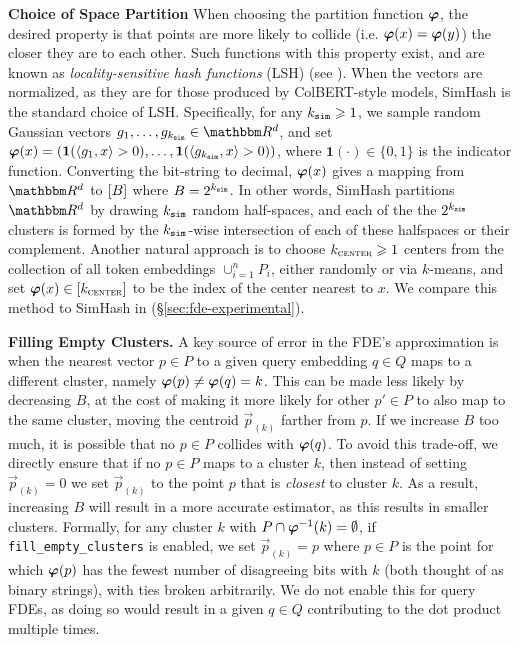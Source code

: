 \textbf{Choice of Space Partition} When choosing the partition function $\bvarphi$, the desired property is that points are more likely to collide (i.e. $\bvarphi(x)=\bvarphi(y)$) the closer they are to each other. Such functions with this property exist, and are known as \textit{locality-sensitive hash functions} (LSH) (see \cite{HIM12}). When the vectors are normalized, as they are for those produced by ColBERT-style models, SimHash \cite{charikar2002similarity} is the standard choice of LSH. Specifically, for any $\ksim \geq 1$, we sample random Gaussian vectors $g_1,\dots,g_{\ksim} \in \R^d$, and set $\bvarphi(x)= (\mathbf{1}(\langle g_1, x\rangle > 0), \dots,\mathbf{1}(\langle g_{\ksim} , x\rangle> 0) )$, where $\mathbf{1}(\cdot) \in \{0,1\}$ is the indicator function.  Converting the bit-string to decimal, $\bvarphi(x)$ gives a mapping from $\R^d$ to $[\buckets]$ where $\buckets = 2^{\ksim}$. In other words, SimHash partitions $\R^d$ by drawing $\ksim$ random half-spaces, and each of the the $2^{\ksim}$ clusters is formed by the $\ksim$-wise intersection of each of these halfspaces or their complement.
Another natural approach is to choose $k_{\textsc{center}} \geq 1$ centers from the collection of all token embeddings $\cup_{i=1}^n P_i$, either randomly or via $k$-means, and set $\bvarphi(x) \in [k_{\textsc{center}}]$ to be the index of the center nearest to $x$. We compare this method to SimHash in (§\ref{sec:fde-experimental}). 



\textbf{Filling Empty Clusters.} 
A key source of error in the FDE's approximation is when the nearest vector $p \in P$ to a given query embedding $q \in Q$ maps to a different cluster, namely $\bvarphi(p) \neq \bvarphi(q) = k$. This can be made less likely by decreasing $B$, at the cost of making it more likely for other $p' \in P$ to also map to the same cluster, moving the centroid $\vec{p}_{(k)}$ farther from $p$. If we increase $B$ too much, it is possible that no $p \in P$ collides with $\bvarphi(q)$. To avoid this trade-off, we directly ensure that if no $p \in P$ maps to a cluster $k$, then instead of setting $\vec{p}_{(k)} = 0$ we set $\vec{p}_{(k)}$ to the point $p$ that is \emph{closest} to cluster $k$. As a result, increasing $B$ will result in a more accurate estimator, as this results in smaller clusters. 
Formally, for any cluster $k$ with $P \cap \bvarphi^{-1}(k) = \emptyset$, if \texttt{fill\_empty\_clusters} is enabled, we set $\vec{p}_{(k)} = p$ where $p \in P$ is the point for which $\bvarphi(p)$ has the fewest number of disagreeing bits with $k$ (both thought of as binary strings), with ties broken arbitrarily. We do not enable this for query FDEs, as doing so would result in a given $q \in Q$ contributing to the dot product multiple times. 




